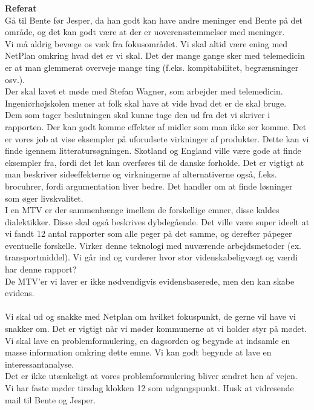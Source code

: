\textbf{Referat} 
\\
Gå til Bente før Jesper, da han godt kan have andre meninger end Bente på det område, og det kan godt være at der er uoverensstemmelser med meninger.\\
Vi må aldrig bevæge os væk fra fokusområdet. Vi skal altid være ening med NetPlan omkring hvad det er vi skal. Det der mange gange sker med telemedicin er at man glemmerat overveje mange ting (f.eks. kompitabilitet, begrænsninger osv.). \\
Der skal lavet et møde med Stefan Wagner, som arbejder med telemedicin. Ingeniørhøjskolen mener at folk skal have at vide hvad det er de skal bruge. \\
Dem som tager beslutningen skal kunne tage den ud fra det vi skriver i rapporten. Der kan godt komme effekter af midler som man ikke ser komme. Det er vores job at vise eksempler på uforudsete virkninger af produkter. Dette kan vi finde igennem litteratursøgningen. Skotland og England ville være gode at finde eksempler fra, fordi det let kan overføres til de danske forholde. Det er vigtigt at man beskriver sideeffekterne og virkningerne af alternativerne også, f.eks. brocuhrer, fordi argumentation liver bedre. Det handler om at finde løsninger som øger livskvalitet. \\
I en MTV er der sammenhænge imellem de forskellige emner, disse kaldes dialektikker. Disse skal også beskrives dybdegående. Det ville være super ideelt at vi fandt 12 antal rapporter som alle peger på det samme, og derefter påpeger eventuelle forskelle. Virker denne teknologi med nuværende arbejdsmetoder (ex. transportmiddel). Vi går ind og vurderer hvor stor videnskabeligvægt og værdi har denne rapport? \\
De MTV'er vi laver er ikke nødvendigvis evidensbaserede, men den kan skabe evidens.\\
\\Vi skal ud og snakke med Netplan om hvilket fokuspunkt, de gerne vil have vi snakker om. Det er vigtigt når vi møder kommunerne at vi holder styr på mødet. Vi skal lave en problemformulering, en dagsorden og begynde at indsamle en masse information omkring dette emne. Vi kan godt begynde at lave en interessantanalyse.\\
Det er ikke utænkeligt at vores problemformulering bliver ændret hen af vejen.\\
Vi har faste møder tirsdag klokken 12 som udgangspunkt. Husk at vidresende mail til Bente og Jesper.\\




